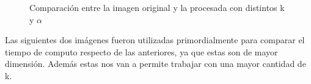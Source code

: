 \documentclass[a4paper]{article}
\begin{document}
\begin{figure}[H]
\centering
{}
\caption{Comparación entre la imagen original y la procesada con distintos k y $\alpha$}
\end{figure}
    
Las siguientes  dos imágenes fueron utilizadas primordialmente para comparar el tiempo de computo respecto de las anteriores, ya que estas son de mayor dimensión. Además estas nos van a  permite trabajar con una mayor cantidad de k.
\end{document}

